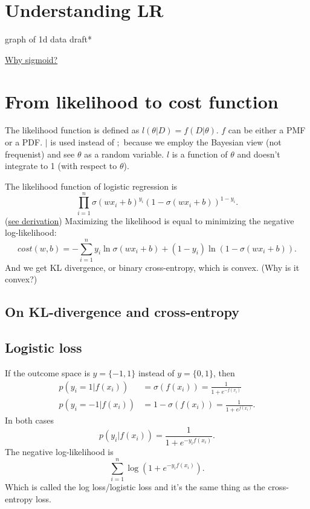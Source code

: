 \documentclass{report}
\begin{document}
  \section{Understanding LR}
  graph of 1d data draft*

  \href{https://towardsdatascience.com/why-sigmoid-a-probabilistic-perspective-42751d82686}{Why sigmoid?}
  \section{From likelihood to cost function}
  The likelihood function is defined as $l\left( \theta|D \right) = f\left( D|\theta\right) $. $f$ can be either a PMF or a PDF. $|$ is used instead of $;$ because we employ the Bayesian view (not frequenist) and see $\theta$ as a random variable. $l$ is a function of $\theta$ and doesn't integrate to 1 (with respect to $\theta$).

The likelihood function of logistic regression is 
\begin{displaymath}
\prod_{i=1}^{n} {\sigma\left( wx_{i} + b \right)^{y_{i}}\left( 1 - \sigma\left( wx_{i} + b\right)\right)^{1 - y_{i} }}.
\end{displaymath} (\href{https://zstevenwu.com/courses/s20/csci5525/resources/slides/lecture05.pdf}{see derivation})
Maximizing the likelihood is equal to minimizing the negative log-likelihood: \[
	cost\left( w, b \right) = -\sum_{i=1}^{n} y_{i} \ln \sigma \left(wx_{i} + b\right) + \left( 1 - y_{i} \right) \ln \left(1 - \sigma\left(wx_{i} + b\right)\right)
.\] 
And we get KL divergence, or binary cross-entropy, which is convex. (Why is it convex?)

\subsection{On KL-divergence and cross-entropy}
\subsection{Logistic loss}
If the outcome space is $y=\{-1, 1\}$ instead of  $y=\{0, 1\}$, then
\begin{align*}
	p(y_i = 1 | f(x_i)) &= \sigma(f(x_i)) = \frac{1}{1 + e^{-f(x_i)}} \\
	p(y_i = -1 | f(x_i)) &= 1 - \sigma(f(x_i)) = \frac{1}{1 + e^{f(x_i)}}
.\end{align*}
In both cases \[
	p(y_i | f(x_i)) = \frac{1}{1 + e^{-y_if(x_i)}}
.\]  
The negative log-likelihood is \[
	\sum_{i=1}^{n} \log(1 + e^{-y_if(x_i)})
.\] 
Which is called the log loss/logistic loss and it's the same thing as the cross-entropy loss.
\end{document}
